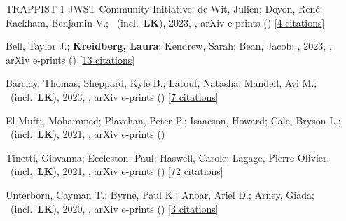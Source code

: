 \item[{\color{numcolor}\scriptsize15}] TRAPPIST-1 JWST Community Initiative; de Wit, Julien; Doyon, Ren{\'e}; Rackham, Benjamin V.; \etal\ (incl.\ \textbf{LK}), 2023, , arXiv e-prints () [\href{https://ui.adsabs.harvard.edu/abs/2023arXiv231015895T}{4 citations}]

\item[{\color{numcolor}\scriptsize14}] Bell, Taylor J.; \textbf{Kreidberg, Laura}; Kendrew, Sarah; Bean, Jacob; \etal, 2023, , arXiv e-prints () [\href{https://ui.adsabs.harvard.edu/abs/2023arXiv230106350B}{13 citations}]

\item[{\color{numcolor}\scriptsize13}] Barclay, Thomas; Sheppard, Kyle B.; Latouf, Natasha; Mandell, Avi M.; \etal\ (incl.\ \textbf{LK}), 2023, , arXiv e-prints () [\href{https://ui.adsabs.harvard.edu/abs/2023arXiv230110866B}{7 citations}]

\item[{\color{numcolor}\scriptsize12}] El Mufti, Mohammed; Plavchan, Peter P.; Isaacson, Howard; Cale, Bryson L.; \etal\ (incl.\ \textbf{LK}), 2021, , arXiv e-prints ()

\item[{\color{numcolor}\scriptsize11}] Tinetti, Giovanna; Eccleston, Paul; Haswell, Carole; Lagage, Pierre-Olivier; \etal\ (incl.\ \textbf{LK}), 2021, , arXiv e-prints () [\href{https://ui.adsabs.harvard.edu/abs/2021arXiv210404824T}{72 citations}]

\item[{\color{numcolor}\scriptsize10}] Unterborn, Cayman T.; Byrne, Paul K.; Anbar, Ariel D.; Arney, Giada; \etal\ (incl.\ \textbf{LK}), 2020, , arXiv e-prints () [\href{https://ui.adsabs.harvard.edu/abs/2020arXiv200708665U}{3 citations}]

